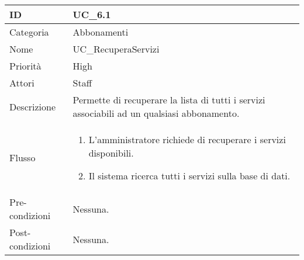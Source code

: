 \begin{center}
\begin{tabular}{ |p{2cm}|p{13cm}|  }
\hline
ID & UC\_6.1 \\\hline
Categoria & Abbonamenti\\\hline
Nome & UC\_RecuperaServizi\\\hline
Priorità & High \\\hline
Attori &  Staff \\\hline
Descrizione & Permette di recuperare la lista di tutti i servizi associabili ad un qualsiasi abbonamento.\\\hline
Flusso &  	\begin{enumerate}
			\item L'amministratore richiede di recuperare i servizi disponibili.
			\item Il sistema ricerca tutti i servizi sulla base di dati.
		\end{enumerate}\\\hline
Pre-condizioni &  Nessuna.\\\hline
Post-condizioni &  Nessuna.\\\hline
\end{tabular}
\label{table_use_case:6.1}\newline


\end{center}
